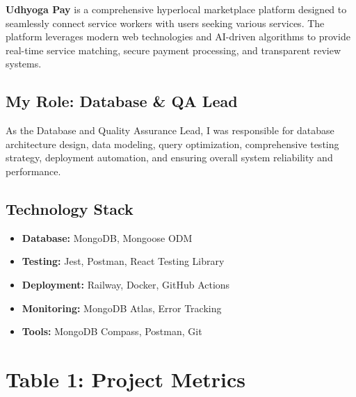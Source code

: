 \documentclass[12pt,a4paper]{article}
\begin{document}
\textbf{Udhyoga Pay} is a comprehensive hyperlocal marketplace platform designed to seamlessly connect service workers with users seeking various services. The platform leverages modern web technologies and AI-driven algorithms to provide real-time service matching, secure payment processing, and transparent review systems.

\subsection*{My Role: Database \& QA Lead}
As the Database and Quality Assurance Lead, I was responsible for database architecture design, data modeling, query optimization, comprehensive testing strategy, deployment automation, and ensuring overall system reliability and performance.

\subsection*{Technology Stack}
\begin{itemize}[leftmargin=*]
    \item \textbf{Database:} MongoDB, Mongoose ODM
    \item \textbf{Testing:} Jest, Postman, React Testing Library
    \item \textbf{Deployment:} Railway, Docker, GitHub Actions
    \item \textbf{Monitoring:} MongoDB Atlas, Error Tracking
    \item \textbf{Tools:} MongoDB Compass, Postman, Git
\end{itemize}

\vspace{0.3cm}

\section*{Table 1: Project Metrics}
\end{document}
